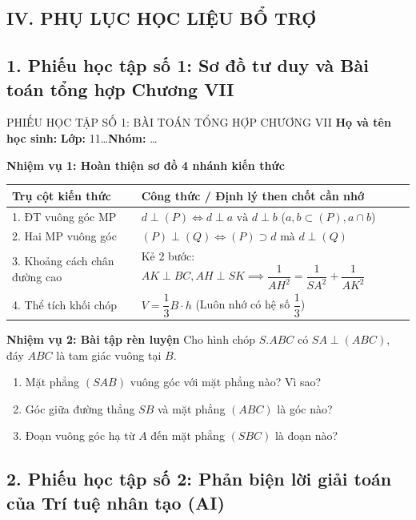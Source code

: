 \documentclass[12pt, a4paper]{article}
\begin{document}
\begin{itemize}[leftmargin=1.2cm]
\section*{IV. PHỤ LỤC HỌC LIỆU BỔ TRỢ}

\subsection*{1. Phiếu học tập số 1: Sơ đồ tư duy và Bài toán tổng hợp Chương VII}

\begin{pedabox}{PHIẾU HỌC TẬP SỐ 1: BÀI TOÁN TỔNG HỢP CHƯƠNG VII}
    \textbf{Họ và tên học sinh:} \dotfill \textbf{Lớp:} 11\dots \textbf{Nhóm:} \dots

    \textbf{Nhiệm vụ 1: Hoàn thiện sơ đồ 4 nhánh kiến thức}
    \begin{center}
    \begin{tabular}{|l|l|}
    \hline
    \textbf{Trụ cột kiến thức} & \textbf{Công thức / Định lý then chốt cần nhớ} \\ \hline
    1. ĐT vuông góc MP & $d \perp (P) \iff d \perp a \text{ và } d \perp b$ ($a, b \subset (P), a \cap b$) \\ \hline
    2. Hai MP vuông góc & $(P) \perp (Q) \iff (P) \supset d \text{ mà } d \perp (Q)$ \\ \hline
    3. Khoảng cách chân đường cao & Kẻ 2 bước: $AK \perp BC, AH \perp SK \implies \dfrac{1}{AH^2} = \dfrac{1}{SA^2} + \dfrac{1}{AK^2}$ \\ \hline
    4. Thể tích khối chóp & $V = \dfrac{1}{3} B \cdot h$ (Luôn nhớ có hệ số $\dfrac{1}{3}$) \\ \hline
    \end{tabular}
    \end{center}

    \textbf{Nhiệm vụ 2: Bài tập rèn luyện}
    Cho hình chóp $S.ABC$ có $SA \perp (ABC)$, đáy $ABC$ là tam giác vuông tại $B$.
    \begin{enumerate}
        \item Mặt phẳng $(SAB)$ vuông góc với mặt phẳng nào? Vì sao? \dotfill
        \item Góc giữa đường thẳng $SB$ và mặt phẳng $(ABC)$ là góc nào? \dotfill
        \item Đoạn vuông góc hạ từ $A$ đến mặt phẳng $(SBC)$ là đoạn nào? \dotfill
    \end{enumerate}
\end{pedabox}

\subsection*{2. Phiếu học tập số 2: Phản biện lời giải toán của Trí tuệ nhân tạo (AI)}


\end{itemize}
\end{document}
